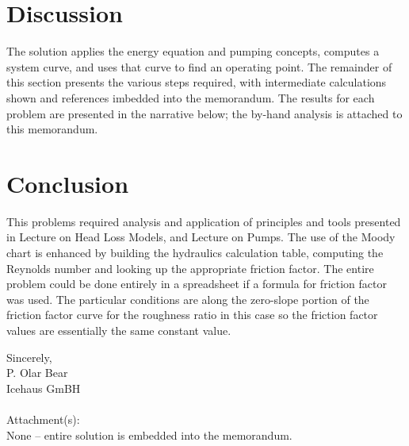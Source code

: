 \documentclass[12pt]{article}
\begin{document}
\section*{\small{Discussion}}
The solution applies the energy equation and pumping concepts, computes a system curve, and uses that curve to find an operating point.
The remainder of this section presents the various steps required, with intermediate calculations shown and references imbedded into the memorandum.
The results for each problem are presented in the narrative below; the by-hand analysis is attached to this memorandum.


\section*{\small{Conclusion}}
This problems required analysis and application of principles and tools presented in Lecture on Head Loss Models, and Lecture on Pumps.
The use of the Moody chart is enhanced by building the hydraulics calculation table, computing the Reynolds number and looking up the appropriate friction factor.
The entire problem could be done entirely in a spreadsheet if a formula for friction factor was used.   
The particular conditions are along the zero-slope portion of the friction factor curve for the roughness ratio in this case so the friction factor values are essentially the same constant value.

Sincerely, \\
P. Olar Bear \\
Icehaus GmBH \\
\\Attachment(s):\\
None -- entire solution is embedded into the memorandum.

%
%
%
\end{document}

